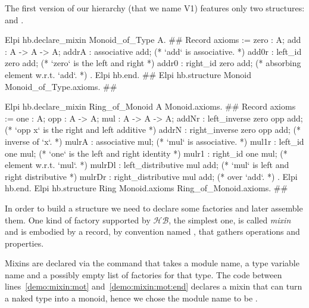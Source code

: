 \documentclass[a4paper,UKenglish,cleveref, autoref]{lipics-v2019}
\newcommand{\HB}{\ensuremath{\mathcal{HB}}}
\newcommand{\mixin}{mixin}
\newcommand{\Mixins}{Mixins}
\newcommand{\factory}{factory}
\newcommand{\factories}{factories}
\theoremstyle{implem}
\theoremstyle{implem}
\theoremstyle{axiom}
\theoremstyle{abscommand}
\theoremstyle{command}
\begin{document}
The first version of our hierarchy (that we name V1) features only two
structures:  and .
\begin{coqcode}
Elpi hb.declare_mixin Monoid_of_Type A.                       #\label{demo:mixin:mot}#
  Record axioms := {
    zero : A;
    add : A -> A -> A;
    addrA : associative add;              (* `add` is associative.                  *)
    add0r : left_id zero add;             (* `zero` is the left and right           *)
    addr0 : right_id zero add;            (*   absorbing element w.r.t. `add`.      *)
}.
Elpi hb.end.                                              #\label{demo:mixin:mot:end}#
Elpi hb.structure Monoid Monoid_of_Type.axioms.        #\label{demo:structure:monoid}#

Elpi hb.declare_mixin Ring_of_Monoid A Monoid.axioms.       #\label{demo:mixin:rom}#
  Record axioms := {
    one : A;
    opp : A -> A;
    mul : A -> A -> A;
    addNr : left_inverse zero opp add;   (* `opp x` is the right and left additive  *)
    addrN : right_inverse zero opp add;  (*   inverse of `x`.                       *)
    mulrA : associative mul;             (* `mul` is associative.                   *)
    mul1r : left_id one mul;             (* `one` is the left and right identity    *)
    mulr1 : right_id one mul;            (*   element w.r.t. `mul`.                 *)
    mulrDl : left_distributive mul add;  (* `mul` is left and right distributive    *)
    mulrDr : right_distributive mul add; (*   over `add`.                           *)
  }.
Elpi hb.end.
Elpi hb.structure Ring Monoid.axioms Ring_of_Monoid.axioms. #\label{demo:structure:ring}#

\end{coqcode}

In order to build a structure we need to declare some \factories{} and
later assemble them. One kind of \factory{} supported by \HB{}, the simplest
one, is called \emph{\mixin{}} and is embodied by a record, by convention named
, that gathers operations and properties.

\Mixins{} are declared via the  command
that takes a module name,
a type variable name and a possibly empty list of \factories{} for that type.
The code between lines~\ref{demo:mixin:mot}
and~\ref{demo:mixin:mot:end} declares a \mixin{} that can turn a naked
type  into a monoid, hence we chose the module name to be .
\end{document}
